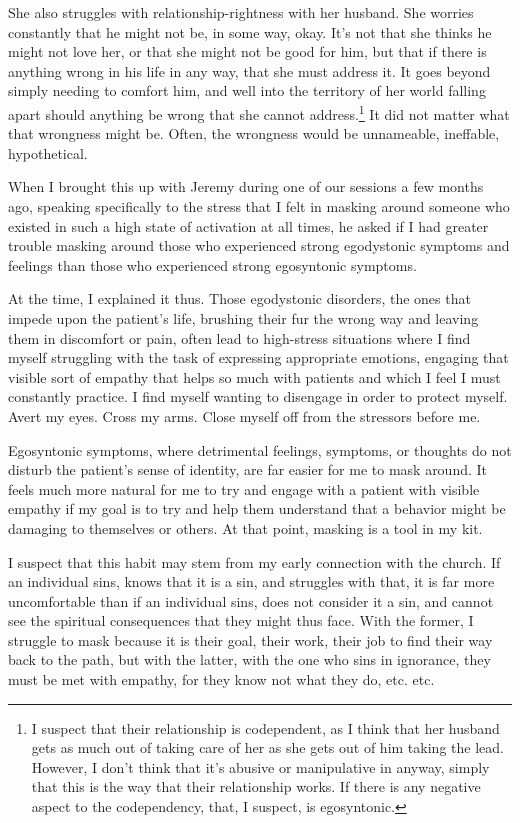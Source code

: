 She also struggles with relationship-rightness with her husband. She worries constantly that he might not be, in some way, okay. It's not that she thinks he might not love her, or that she might not be good for him, but that if there is anything wrong in his life in any way, that she must address it. It goes beyond simply needing to comfort him, and well into the territory of her world falling apart should anything be wrong that she cannot address.\footnote{I suspect that their relationship is codependent, as I think that her husband gets as much out of taking care of her as she gets out of him taking the lead. However, I don't think that it's abusive or manipulative in anyway, simply that this is the way that their relationship works. If there is any negative aspect to the codependency, that, I suspect, is egosyntonic.} It did not matter what that wrongness might be. Often, the wrongness would be unnameable, ineffable, hypothetical.

When I brought this up with Jeremy during one of our sessions a few months ago, speaking specifically to the stress that I felt in masking around someone who existed in such a high state of activation at all times, he asked if I had greater trouble masking around those who experienced strong egodystonic symptoms and feelings than those who experienced strong egosyntonic symptoms.

At the time, I explained it thus. Those egodystonic disorders, the ones that impede upon the patient's life, brushing their fur the wrong way and leaving them in discomfort or pain, often lead to high-stress situations where I find myself struggling with the task of expressing appropriate emotions, engaging that visible sort of empathy that helps so much with patients and which I feel I must constantly practice. I find myself wanting to disengage in order to protect myself. Avert my eyes. Cross my arms. Close myself off from the stressors before me.

Egosyntonic symptoms, where detrimental feelings, symptoms, or thoughts do not disturb the patient's sense of identity, are far easier for me to mask around. It feels much more natural for me to try and engage with a patient with visible empathy if my goal is to try and help them understand that a behavior might be damaging to themselves or others. At that point, masking is a tool in my kit.

I suspect that this habit may stem from my early connection with the church. If an individual sins, knows that it is a sin, and struggles with that, it is far more uncomfortable than if an individual sins, does not consider it a sin, and cannot see the spiritual consequences that they might thus face. With the former, I struggle to mask because it is their goal, their work, their job to find their way back to the path, but with the latter, with the one who sins in ignorance, they must be met with empathy, for they know not what they do, etc. etc.

